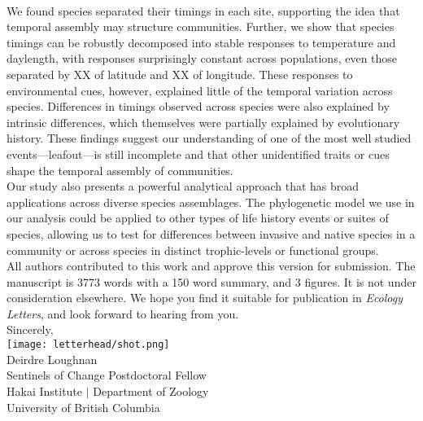 \documentclass[11pt,a4paper]{article}
\begin{document}
\vspace{1.5ex}\\
\noindent  
We found species separated their timings in each site, supporting the idea that temporal assembly may structure communities. Further, we show that species timings can be robustly decomposed into stable responses to temperature and daylength, with responses surprisingly constant across populations, even those separated by XX \degree of latitude and XX \degree of longitude. These responses to environmental cues, however, explained little of the temporal variation across species. Differences in timings observed across species were also explained by intrinsic differences, which themselves were partially explained by evolutionary history. These findings suggest our understanding of one of the most well studied events---leafout---is still incomplete and that other unidentified traits or cues shape the temporal assembly of communities. 
\vspace{1.5ex}\\
Our study also presents a powerful analytical approach that has broad applications across diverse species assemblages. The phylogenetic model we use in our analysis could be applied to other types of life history events or suites of species, allowing us to test for differences between invasive and native species in a community or across species in distinct trophic-levels or functional groups.
\vspace{1.5ex}\\
\noindent All authors contributed to this work and approve this version for submission. The manuscript is 3773 words with a 150 word summary, and 3 figures. It is not under consideration elsewhere. We hope you find it suitable for publication in \emph{Ecology Letters}, and look forward to hearing from you. 
\vspace{1.5ex}\\
\noindent Sincerely, \\
\texttt{[image: letterhead/shot.png]} \\ 
\noindent Deirdre Loughnan\\
\noindent Sentinels of Change Postdoctoral Fellow\\ %
\noindent Hakai Institute $|$ Department of Zoology\\
\noindent University of British Columbia
\newpage
\vspace{-5ex}
% 


\newpage
\end{document}
